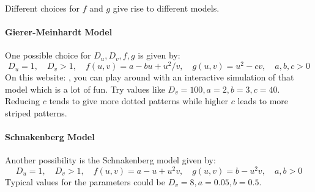 

\medskip
Different choices for $f$ and $g$ give rise to different models.


\paragraph{Gierer-Meinhardt Model} 
One possible choice for $D_u, D_v, f, g$ is given by:
\begin{equation}
D_u = 1, \quad
D_v > 1, \quad
f(u,v) = a - b u + u^2 / v, \quad 
g(u,v) = u^2 - c v, \quad
a,b,c > 0
\end{equation}
On this website: \cite{VPDE_GiererMeinhardt}, you can play around with an interactive simulation of that model which is a lot of fun. Try values like $D_v = 100, a=2, b=3, c=40$. Reducing $c$ tends to give more dotted patterns while higher $c$ leads to more striped patterns.



\paragraph{Schnakenberg Model}
Another possibility is the Schnakenberg model given by:
\begin{equation}
D_u = 1, \quad
D_v > 1, \quad
f(u,v) = a - u + u^2 v, \quad 
g(u,v) = b     - u^2 v, \quad
a,b > 0
\end{equation}
Typical values for the parameters could be $D_v = 8, a = 0.05, b = 0.5$.



